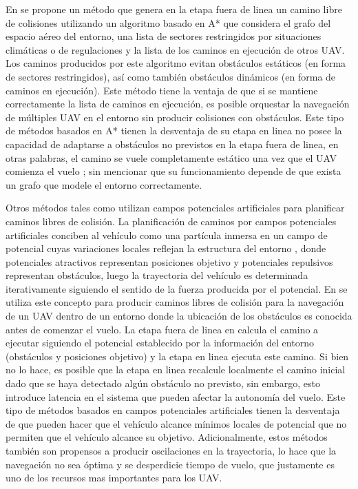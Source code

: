 En \cite{shi2018collision} se propone un método que genera en la etapa fuera de linea un camino libre de colisiones utilizando un algoritmo basado en A* que considera el grafo del espacio aéreo del entorno, una lista de sectores restringidos por situaciones climáticas o de regulaciones y la lista de los caminos en ejecución de otros UAV. Los caminos producidos por este algoritmo evitan obstáculos estáticos (en forma de sectores restringidos), así como también obstáculos dinámicos (en forma de caminos en ejecución). Este método tiene la ventaja de que si se mantiene correctamente la lista de caminos en ejecución, es posible orquestar la navegación de múltiples UAV en el entorno sin producir colisiones con obstáculos. Este tipo de métodos basados en A* tienen la desventaja de su etapa en linea no posee la capacidad de adaptarse a obstáculos no previstos en la etapa fuera de linea, en otras palabras, el camino se vuele completamente estático una vez que el UAV comienza el vuelo \cite{park2020boundary}; sin mencionar que su funcionamiento depende de que exista un grafo que modele el entorno correctamente.

Otros métodos tales como \cite{lifen2016path} utilizan campos potenciales artificiales para planificar caminos libres de colisión. La planificación de caminos por campos potenciales artificiales conciben al vehículo como una partícula inmersa en un campo de potencial cuyas variaciones locales reflejan la estructura del entorno \cite{bermudez2004aplicacion}, donde potenciales atractivos representan posiciones objetivo y potenciales repulsivos representan obstáculos, luego la trayectoria del vehículo es determinada iterativamente siguiendo el sentido de la fuerza producida por el potencial. En \cite{lifen2016path} se utiliza este concepto para producir caminos libres de colisión para la navegación de un UAV dentro de un entorno donde la ubicación de los obstáculos es conocida antes de comenzar el vuelo. La etapa fuera de linea en \cite{lifen2016path} calcula el camino a ejecutar siguiendo el potencial establecido por la información del entorno (obstáculos y posiciones objetivo) y la etapa en linea ejecuta este camino. Si bien \cite{lifen2016path} no lo hace, es posible que la etapa en linea recalcule localmente el camino inicial dado que se haya detectado algún obstáculo no previsto, sin embargo, esto introduce latencia en el sistema que pueden afectar la autonomía del vuelo. Este tipo de métodos basados en campos potenciales artificiales tienen la desventaja de que pueden hacer que el vehículo alcance mínimos locales de potencial que no permiten que el vehículo alcance su objetivo. Adicionalmente, estos métodos también son propensos a producir oscilaciones en la trayectoria, lo hace que la navegación no sea óptima y se desperdicie tiempo de vuelo, que justamente es uno de los recursos mas importantes para los UAV.


